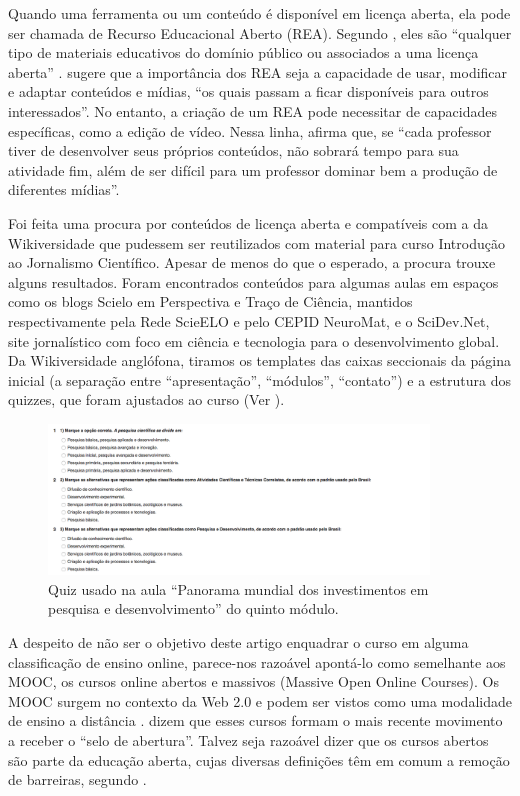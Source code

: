 \documentclass{textolivre}
\begin{document}
Quando uma ferramenta ou um conteúdo é disponível em licença aberta, ela pode ser chamada de Recurso Educacional Aberto (REA). Segundo \textcite[p. 260]{aires2016}, eles são “qualquer tipo de materiais educativos do domínio público ou associados a uma licença aberta” \cite[p. 260]{aires2016}. \textcite[p. 52]{tori2015} sugere que a importância dos REA seja a capacidade de usar, modificar e adaptar conteúdos e mídias, “os quais passam a ficar disponíveis para outros interessados”. No entanto, a criação de um REA pode necessitar de capacidades específicas, como a edição de vídeo. Nessa linha, \textcite[p. 52]{tori2015} afirma que, se “cada professor tiver de desenvolver seus próprios conteúdos, não sobrará tempo para sua atividade fim, além de ser difícil para um professor dominar bem a produção de diferentes mídias”.

Foi feita uma procura por conteúdos de licença aberta e compatíveis com a da Wikiversidade que pudessem ser reutilizados com material para curso Introdução ao Jornalismo Científico. Apesar de menos do que o esperado, a procura trouxe alguns resultados. Foram encontrados conteúdos para algumas aulas em espaços como os blogs Scielo em Perspectiva e Traço de Ciência, mantidos respectivamente pela Rede ScieELO e pelo CEPID NeuroMat, e o SciDev.Net, site jornalístico com foco em ciência e tecnologia para o desenvolvimento global. Da Wikiversidade anglófona, tiramos os templates das caixas seccionais da página inicial (a separação entre “apresentação”, “módulos”, “contato”) e a estrutura dos quizzes, que foram ajustados ao curso (Ver ).

\begin{figure}[htbp]
\centering
\includegraphics[width=0.9\textwidth]{fig05.png}
\caption{Quiz usado na aula “Panorama mundial dos investimentos em pesquisa e desenvolvimento” do quinto módulo.}
\label{fig05}
\end{figure}

A despeito de não ser o objetivo deste artigo enquadrar o curso em alguma classificação de ensino online, parece-nos razoável apontá-lo como semelhante aos MOOC, os cursos online abertos e massivos (Massive Open Online Courses). Os MOOC surgem no contexto da Web 2.0 e podem ser vistos como uma modalidade de ensino a distância \cite[p. 185]{forno2013}. \textcite[p. 116]{amiel2015} dizem que esses cursos formam o mais recente movimento a receber o “selo de abertura”. Talvez seja razoável dizer que os cursos abertos são parte da educação aberta, cujas diversas definições têm em comum a remoção de barreiras, segundo \textcite[p. 180]{forno2013}.
\end{document}
